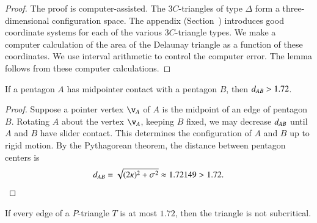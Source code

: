 \begin{proof} The proof is computer-assisted.  The $3C$-triangles of
  type $\Delta$ form a three-dimensional configuration space.  The
  appendix (Section~) introduces good coordinate
  systems for each of the various $3C$-triangle types.  We make a
  computer calculation of the area of the Delaunay triangle as a
  function of these coordinates.  We use interval arithmetic to
  control the computer error.  The lemma follows from these computer
  calculations.
\end{proof}



\begin{lemma}  
  If a pentagon $A$ has midpointer contact with a pentagon $B$, then
  $d_{AB} > 1.72$.
\end{lemma}

\begin{proof} Suppose a pointer vertex $\v_A$ of $A$ is the midpoint of an
  edge of pentagon $B$.  Rotating $A$ about the vertex $\v_A$, keeping
  $B$ fixed, we may decrease $d_{AB}$ until $A$ and $B$
  have slider contact.  This determines the configuration of $A$ and
  $B$ up to rigid motion.  By the Pythagorean theorem, the
  distance between pentagon centers is
\[
d_{AB} = \sqrt{(2\kappa)^2 + \sigma^2} \approx 1.72149 > 1.72.
\] %
\end{proof}

\begin{lemma}
  If every edge of a $P$-triangle $T$ is at most $1.72$, then the
  triangle is not subcritical.
\end{lemma}

